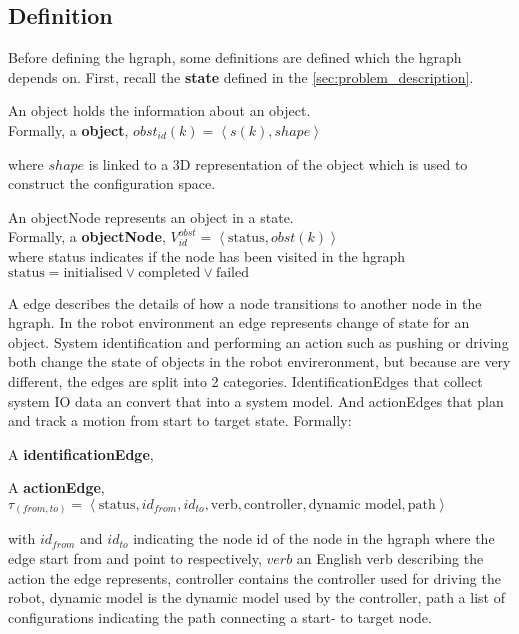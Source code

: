 \subsection{Definition}%
\label{subsec:hgraph_definition}
Before defining the \ac{hgraph}, some definitions are defined which the \ac{hgraph} depends on. First, recall the \textbf{state} defined in the \cref{sec:problem_description}.\bs

An object holds the information about an object.\\Formally, a \textbf{object},  $obst_{id}(k) = \left\langle s(k), shape \right\rangle $\bs

where $shape$ is linked to a 3D representation of the object which is used to construct the configuration space.\bs

An objectNode represents an object in a state.\\Formally, a \textbf{objectNode}, $V^{obst}_{id} =\left\langle \textrm{status}, obst(k)\right\rangle $\\where status indicates if the node has been visited in the \ac{hgraph}$\textrm{status} = \textrm{initialised} \lor \textrm{completed} \lor \textrm{failed}$\bs

A edge describes the details of how a node transitions to another node in the \ac{hgraph}. In the robot environment an edge represents change of state for an object. System identification and performing an action such as pushing or driving both change the state of objects in the robot envireronment, but because are very different, the edges are split into 2 categories. IdentificationEdges that collect system \ac{IO} data an convert that into a system model. And actionEdges that plan and track a motion from start to target state. Formally:\bs

A \textbf{identificationEdge}, 

A \textbf{actionEdge}, $\tau_{(from, to)} = \left\langle \textrm{status}, id_{from}, id_{to}, \textrm{verb}, \textrm{controller},\textrm{dynamic model}, \textrm{path}\right\rangle$\bs

with $id_{from}$ and $id_{to}$ indicating the node id of the node in the \ac{hgraph} where the edge start from and point to respectively, $verb$ an English verb describing the action the edge represents, controller contains the controller used for driving the robot, dynamic model is the dynamic model used by the controller, path a list of configurations indicating the path connecting a start- to target node.\bs

